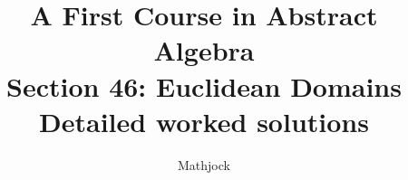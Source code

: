 
\title{\textbf{A First Course in Abstract Algebra}\\[0.3em]Section 46: Euclidean Domains\\[0.3em]\large Detailed worked solutions}
\author{Mathjock}
\date{}

\maketitle
\bookinfo
\tableofcontents
\clearpage
\renewcommand{\thesection}{46}
\renewcommand{\theHsection}{fraleigh.46}


